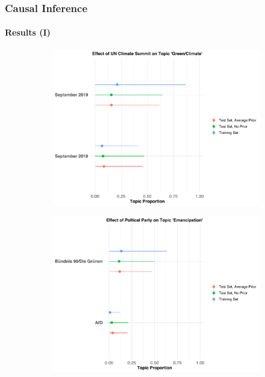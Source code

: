 \documentclass[xcolor=dvipsnames]{beamer}
\begin{document}
\begin{frame}
\frametitle{Causal Inference}
\framesubtitle{Results (I)}
\begin{figure}[h!]
  \centering
  \captionsetup{justification=centering}
  \begin{subfigure}[b]{0.49\linewidth}
    \includegraphics[width=\linewidth]{../plots/presentation/climate_summit_props.pdf}
  \end{subfigure}
  \begin{subfigure}[b]{0.49\linewidth}
    \includegraphics[width=\linewidth]{../plots/presentation/emancipation_props.pdf}
  \end{subfigure}
\end{figure}
\end{frame}
\end{document}
